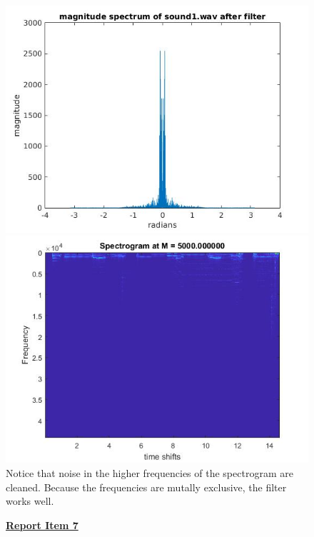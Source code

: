 \documentclass{article}
\begin{document}
\begin{figure}[H]
\includegraphics[scale = .5]{report6_3}
\includegraphics[scale = .5]{report6_4}
\\ Notice that noise in the higher frequencies of the spectrogram are cleaned. Because the frequencies are mutally exclusive, the filter works well.
\end{figure}

\begin{figure}[H]
\color{red}
\underline{\textbf{Report Item 7}}
\color{black}

\end{figure}
\end{document}
